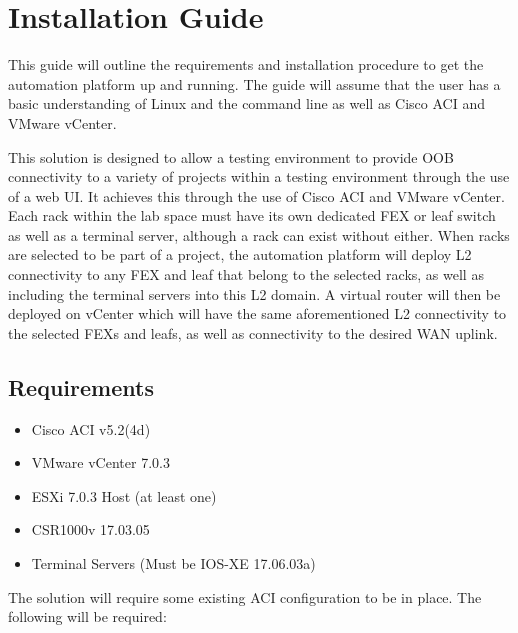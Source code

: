 \chapter{Installation Guide}
\label{chap:appendix-d}
This guide will outline the requirements and installation procedure to get the automation platform up and running. The guide will assume that the user has a basic understanding of Linux and the command line as well as Cisco ACI and VMware vCenter.

This solution is designed to allow a testing environment to provide OOB connectivity to a variety of projects within a testing environment through the use of a web UI. It achieves this through the use of Cisco ACI and VMware vCenter. Each rack within the lab space must have its own dedicated FEX or leaf switch as well as a terminal server, although a rack can exist without either. When racks are selected to be part of a project, the automation platform will deploy L2 connectivity to any FEX and leaf that belong to the selected racks, as well as including the terminal servers into this L2 domain. A virtual router will then be deployed on vCenter which will have the same aforementioned L2 connectivity to the selected FEXs and leafs, as well as connectivity to the desired WAN uplink. 

\section*{Requirements}
\begin{itemize}
    \item Cisco ACI v5.2(4d)
    \item VMware vCenter 7.0.3
    \item ESXi 7.0.3 Host (at least one)
    \item CSR1000v 17.03.05
    \item Terminal Servers (Must be IOS-XE 17.06.03a)
\end{itemize}

The solution will require some existing ACI configuration to be in place. The following will be required:


